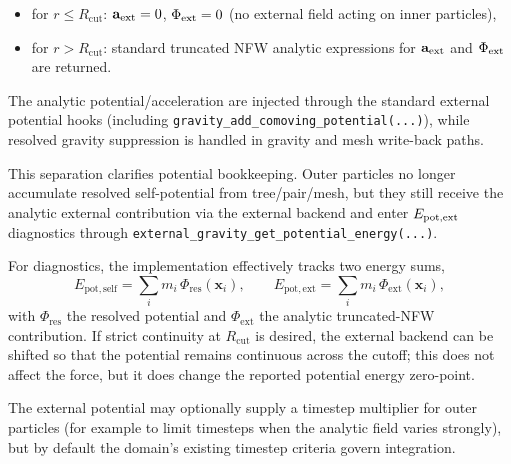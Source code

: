 \begin{itemize}
\item for $r \le R_{\mathrm{cut}}$: \(\mathbf{a}_{\rm ext}=0\), \(\Phi_{\rm ext}=0\) (no external field acting on inner particles),
\item for $r > R_{\mathrm{cut}}$: standard truncated NFW analytic expressions for \(\mathbf{a}_{\rm ext}\) and \(\Phi_{\rm ext}\) are returned.
\end{itemize}

The analytic potential/acceleration are injected through the standard external potential hooks (including \texttt{gravity\_add\_comoving\_potential(...)}), while resolved gravity suppression is handled in gravity and mesh write-back paths.

This separation clarifies potential bookkeeping. Outer particles no longer accumulate resolved self-potential from tree/pair/mesh, but they still receive the analytic external contribution via the external backend and enter \(E_{\rm pot,ext}\) diagnostics through \texttt{external\_gravity\_get\_potential\_energy(...)}.

For diagnostics, the implementation effectively tracks two energy sums,
\begin{equation}
E_{\mathrm{pot,self}} = \sum_i m_i\,\Phi_{\mathrm{res}}(\mathbf{x}_i),
\qquad
E_{\mathrm{pot,ext}} = \sum_i m_i\,\Phi_{\mathrm{ext}}(\mathbf{x}_i),
\end{equation}
with $\Phi_{\mathrm{res}}$ the resolved potential and $\Phi_{\mathrm{ext}}$ the analytic truncated-NFW contribution. If strict continuity at $R_{\mathrm{cut}}$ is desired, the external backend can be shifted so that the potential remains continuous across the cutoff; this does not affect the force, but it does change the reported potential energy zero-point.

The external potential may optionally supply a timestep multiplier for outer particles (for example to limit timesteps when the analytic field varies strongly), but by default the domain's existing timestep criteria govern integration.



